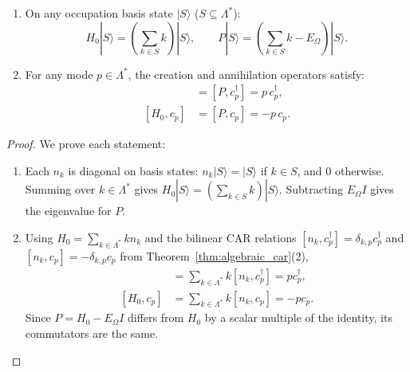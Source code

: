 \begin{theorem}
\label{thm:h0_commutators}
\begin{enumerate}
    \item On any occupation basis state $|S\rangle$ ($S \subseteq \Lambda^*$):
    \begin{equation}
    H_0 |S\rangle = \left( \sum_{k \in S} k \right) |S\rangle, \qquad P |S\rangle = \left( \sum_{k \in S} k - E_\Omega \right) |S\rangle.
    \end{equation}
    \item For any mode $p \in \Lambda^*$, the creation and annihilation operators satisfy:
    \begin{align}
    [H_0, c_p^\dagger] &= [P, c_p^\dagger] = p\, c_p^\dagger, \\
    [H_0, c_p] &= [P, c_p] = -p\, c_p.
    \end{align}
\end{enumerate}
\end{theorem}

\begin{proof}
We prove each statement:
\begin{enumerate}
    \item Each $n_k$ is diagonal on basis states: $n_k |S\rangle = |S\rangle$ if $k \in S$, and $0$ otherwise. Summing over $k \in \Lambda^*$ gives $H_0 |S\rangle = (\sum_{k \in S} k) |S\rangle$. Subtracting $E_\Omega I$ gives the eigenvalue for $P$.
    \item Using $H_0=\sum_{k\in\Lambda^*}k n_k$ and the bilinear CAR relations $[n_k,c_p^\dagger]=\delta_{k,p}c_p^\dagger$ and $[n_k,c_p]=-\delta_{k,p}c_p$ from Theorem~\ref{thm:algebraic_car}(2),
    \begin{align}
    [H_0,c_p^\dagger]&=\sum_{k\in\Lambda^*}k[n_k,c_p^\dagger]=p c_p^\dagger,\\
    [H_0,c_p]&=\sum_{k\in\Lambda^*}k[n_k,c_p]=-p c_p.
    \end{align}
    Since $P=H_0-E_\Omega I$ differs from $H_0$ by a scalar multiple of the identity, its commutators are the same.
\end{enumerate}
\end{proof}

